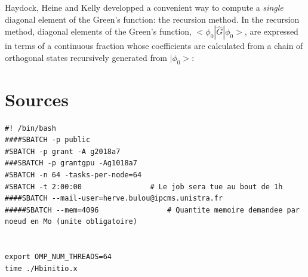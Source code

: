 \documentclass[11pt,a4paper]{article}
\begin{document}
Haydock, Heine and Kelly\cite{haydock1980,giannozzi1988} developped a convenient way to compute a \emph{single} diagonal element of the Green's function: the recursion method.
In the recursion method, diagonal elements of the Green's function, $<\phi_0|\hat{G}|\phi_0>$, are expressed in terms of a continuous fraction whose coefficients are calculated from a chain of orthogonal states recursively generated from $|\phi_0>$:


\section{Sources}
\label{Sources}


 
\begin{verbatim}
#! /bin/bash
####SBATCH -p public
#SBATCH -p grant -A g2018a7
###SBATCH -p grantgpu -Ag1018a7
#SBATCH -n 64 -tasks-per-node=64
#SBATCH -t 2:00:00                # Le job sera tue au bout de 1h
####SBATCH --mail-user=herve.bulou@ipcms.unistra.fr
#####SBATCH --mem=4096                # Quantite memoire demandee par noeud en Mo (unite obligatoire)


export OMP_NUM_THREADS=64
time ./Hbinitio.x

\end{verbatim}
\end{document}
